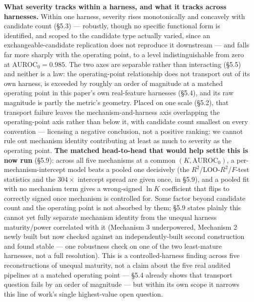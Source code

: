 \documentclass[10pt]{article} %
\begin{document}
\textbf{What severity tracks within a harness, and what it tracks across
harnesses.} Within one harness, severity rises monotonically and concavely
with candidate count (§5.3) --- robustly, though no specific functional form
is identified, and scoped to the candidate type actually varied, since an
exchangeable-candidate replication does not reproduce it downstream --- and
falls far more sharply with the operating point, to a level indistinguishable
from zero at AUROC$_0=0.985$. The two axes are separable rather than
interacting (§5.5) and neither is a law: the operating-point relationship
does not transport out of its own harness, is exceeded by roughly an order of
magnitude at a matched operating point in this paper's own real-feature
harnesses (§5.4), and its raw magnitude is partly the metric's geometry.
Placed on one scale (§5.2), that transport failure leaves the
mechanism-and-harness axis overlapping the operating-point axis rather than
below it, with candidate count smallest on every convention --- licensing a
negative conclusion, not a positive ranking: we cannot rule out mechanism
identity contributing at least as much to severity as the operating point.
\textbf{The matched head-to-head that would help settle this is now run}
(§5.9): across all five mechanisms at a common $(K,\text{AUROC}_0)$, a
per-mechanism-intercept model beats a pooled one decisively (the
$R^2$/LOO-$R^2$/$F$-test statistics and the $304\times$ intercept spread are
given once, in §5.9), and a pooled fit with no mechanism term gives a
wrong-signed $\ln K$ coefficient that flips to correctly signed once
mechanism is controlled for. Some factor beyond candidate count and the
operating point is not absorbed by them; §5.9 states plainly this cannot yet
fully separate mechanism identity from the unequal harness maturity/power
correlated with it (Mechanism 3 underpowered, Mechanism 2 newly built but now
checked against an independently-built second construction and found stable
--- one robustness check on one of the two least-mature harnesses, not a
full resolution). This is a controlled-harness finding across five
reconstructions of unequal maturity, not a claim about the five real audited
pipelines at a matched operating point --- §5.4 already shows that transport
question fails by an order of magnitude --- but within its own scope it
narrows this line of work's single highest-value open question.
\end{document}
